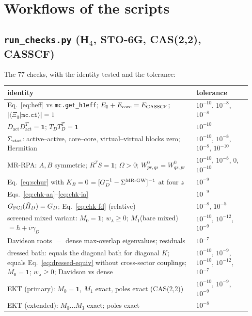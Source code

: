 \documentclass[11pt,a4paper]{article}
\newcommand{\braket}[1]{\langle#1\rangle}
\newcommand{\code}[1]{\texttt{#1}}
\newcommand{\act}{\mathrm{act}}
\begin{document}
\section{Workflows of the scripts}
\label{sec:scripts}

\subsection{\code{run\_checks.py} (H$_4$, STO-6G, CAS(2,2), CASSCF)}

The 77 checks, with the identity tested and the tolerance:
\begin{center}\small
\begin{tabular}{>{\raggedright\arraybackslash}p{9.4cm}>{\raggedright\arraybackslash}p{5.4cm}}
\toprule
identity & tolerance\\
\midrule
Eq.~\eqref{eq:heff} vs \code{mc.get\_h1eff}; $E_0+E_{\rm core}=E_{\rm CASSCF}$; $|\braket{\Xi_0|\code{mc.ci}}|=1$ & $10^{-10}$, $10^{-8}$, $10^{-8}$\\
$D_{\act}D_{\act}^{T}=\mathbf 1$; $T_DT_D^{T}=\mathbf 1$ & $10^{-10}$\\
$\Sigma_{\rm stat}$: active--active, core--core, virtual--virtual blocks zero; Hermitian & $10^{-10}$, $10^{-8}$, $10^{-8}$, $10^{-10}$\\
MR-RPA: $A,B$ symmetric; $R^{T}S=\mathbf 1$; $\Omega>0$; $W^{0}_{pr,qs}=W^{0}_{qs,pr}$ & $10^{-10}$, $10^{-8}$, $0$, $10^{-10}$\\
Eq.~\eqref{eq:schur} with $K_B=0$ $=[G_D^{-1}-\Sigma^{\rm MR\text{-}GW}]^{-1}$ at four $z$ & $10^{-9}$\\
Eqs.~\eqref{eq:chk-aa}--\eqref{eq:chk-ia} & $10^{-9}$\\
$G_{\rm FCI}(\hat H_D)=G_D$; Eq.~\eqref{eq:chk-fd} (relative) & $10^{-8}$, $10^{-5}$\\
screened mixed variant: $M_0=\mathbf 1$; $w_\lambda\ge0$; $M_1$(bare mixed) $=h+\bar v\gamma_D$ & $10^{-10}$, $10^{-12}$, $10^{-9}$\\
Davidson roots $=$ dense max-overlap eigenvalues; residuals & $10^{-7}$\\
dressed bath: equals the diagonal bath for diagonal $K$; equals Eq.~\eqref{eq:dressed-equiv} without cross-sector couplings; $M_0=\mathbf 1$; $w_\lambda\ge0$; Davidson vs dense & $10^{-10}$, $10^{-9}$, $10^{-10}$, $10^{-12}$, $10^{-7}$\\
EKT (primary): $M_0=\mathbf 1$, $M_1$ exact, poles exact (CAS(2,2)) & $10^{-10}$, $10^{-9}$, $10^{-9}$\\
EKT (extended): $M_0\ldots M_3$ exact; poles exact & $10^{-8}$\\

\end{tabular}
\end{center}
\end{document}
